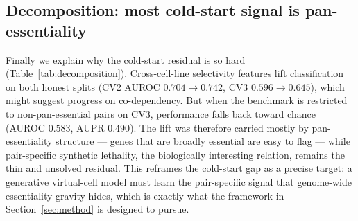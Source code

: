 

\subsection{Decomposition: most cold-start signal is pan-essentiality}
\label{sec:exp-decomp}

Finally we explain why the cold-start residual is so hard
(Table~\ref{tab:decomposition}). Cross-cell-line selectivity features lift
classification on both honest splits (CV2 AUROC $0.704\!\to\!0.742$, CV3
$0.596\!\to\!0.645$), which might suggest progress on co-dependency. But when the
benchmark is restricted to non-pan-essential pairs on CV3, performance falls back
toward chance (AUROC $0.583$, AUPR $0.490$). The lift was therefore carried mostly
by pan-essentiality structure --- genes that are broadly essential are easy to
flag --- while pair-specific synthetic lethality, the biologically interesting
relation, remains the thin and unsolved residual. This reframes the cold-start
gap as a precise target: a generative virtual-cell model must learn the
pair-specific signal that genome-wide essentiality gravity hides, which is exactly
what the framework in Section~\ref{sec:method} is designed to pursue.



\FloatBarrier
